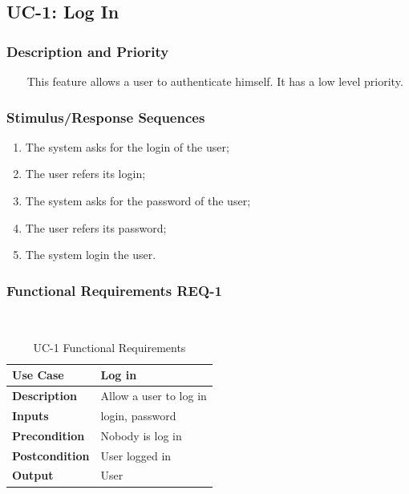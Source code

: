 \documentclass{report}
\begin{document}
\subsection{UC-1: Log In}

\subsubsection*{Description and Priority} ~~~
This feature allows a user to authenticate himself.
It has a low level priority.


\subsubsection*{Stimulus/Response Sequences}
\begin{enumerate}
	\item The system asks for the login of the user;
	\item The user refers its login;
	\item The system asks for the password of the user;
	\item The user refers its password;
	\item The system login the user.
\end{enumerate}


\subsubsection*{Functional Requirements REQ-1} ~~~
\begin{table}[H]
	\begin{center}
		\begin{tabular}{|m{4cm}|m{10cm}|}
		\hline
		\textbf{Use Case} & Log in \\
		\hline
		\textbf{Description} & Allow a user to log in  \\
		\hline
		\textbf{Inputs} & login, password \\
		\hline
		\textbf{Precondition} & Nobody is log in  \\
		\hline
		\textbf{Postcondition} & User logged in \\
		\hline
		\textbf{Output} & User \\
		\hline
		\end{tabular}
	\end{center}
	\caption{UC-1 Functional Requirements}
	\label{table:REQ-1}
\end{table}
\end{document}
